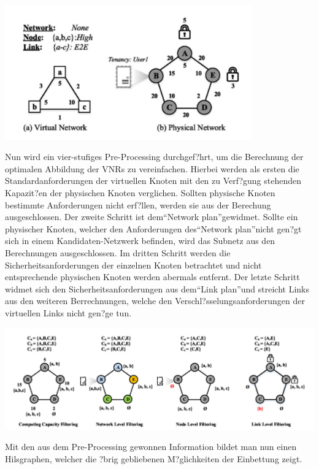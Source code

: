 \documentclass{lni}
\begin{document}
\begin{center}
	\includegraphics[width=0.8\textwidth]{SVNR.pdf}\newline
\end{center}
Nun wird ein vier-stufiges Pre-Processing durchgef?hrt, um die Berechnung der optimalen Abbildung der VNRs zu vereinfachen. Hierbei werden als ersten die Standardanforderungen der virtuellen Knoten mit den zu Verf?gung stehenden Kapazit?en der physischen Knoten verglichen. Sollten physische Knoten bestimmte Anforderungen nicht erf?llen, werden sie aus der Berechung ausgeschlossen. Der zweite Schritt ist dem"`Network plan"'gewidmet. Sollte ein physischer Knoten, welcher den Anforderungen des"`Network plan"'nicht gen?gt sich in einem Kandidaten-Netzwerk befinden, wird das Subnetz aus den Berechnungen ausgeschlossen. Im dritten Schritt werden die Sicherheitsanforderungen der einzelnen Knoten betrachtet und nicht entsprechende physischen Knoten werden abermals entfernt. Der letzte Schritt widmet sich den Sicherheitsanforderungen aus dem"`Link plan"'und streicht Links aus den weiteren Berrechnungen, welche den Verschl?sselungsanforderungen der virtuellen Links nicht gen?ge tun.\newline
\begin{center}
	\includegraphics[width=1\textwidth]{pre-processing.pdf}\newline
\end{center}
Mit den aus dem Pre-Processing gewonnen Information bildet man nun einen Hilsgraphen, welcher die ?brig gebliebenen M?glichkeiten der Einbettung zeigt.\newline
\end{document}
